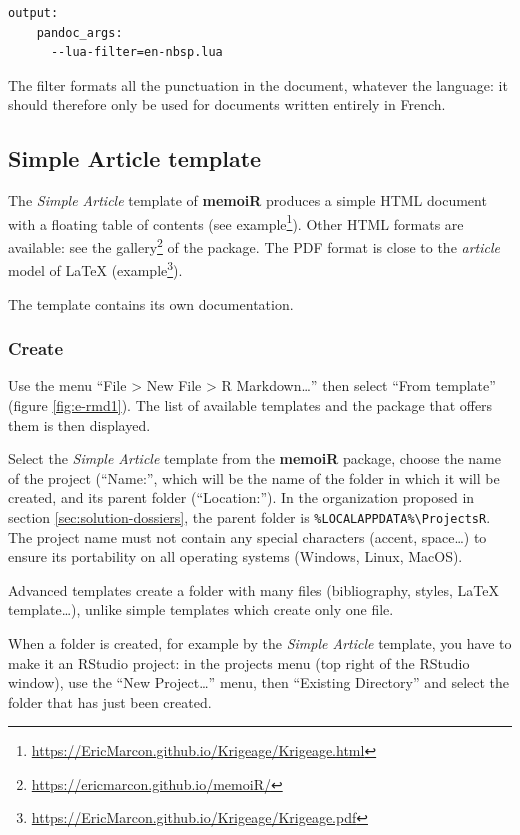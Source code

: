 \documentclass[
  12pt,
  american,
  a4paper,
  extrafontsizes,onecolumn,openright
  ]{memoir}
\begin{document}
\begin{verbatim}
output:
    pandoc_args:
      --lua-filter=en-nbsp.lua
\end{verbatim}

The filter formats all the punctuation in the document, whatever the language: it should therefore only be used for documents written entirely in French.

\subsection{Simple Article template}\label{sec:memo}

The \emph{Simple Article} template of \textbf{memoiR} produces a simple HTML document with a floating table of contents (see example\footnote{\url{https://EricMarcon.github.io/Krigeage/Krigeage.html}}).
Other HTML formats are available: see the gallery\footnote{\url{https://ericmarcon.github.io/memoiR/}} of the package.
The PDF format is close to the \emph{article} model of LaTeX (example\footnote{\url{https://EricMarcon.github.io/Krigeage/Krigeage.pdf}}).

The template contains its own documentation.

\subsubsection{Create}\label{create}

Use the menu \enquote{File \textgreater{} New File \textgreater{} R Markdown\ldots{}} then select \enquote{From template} (figure \ref{fig:e-rmd1}).
The list of available templates and the package that offers them is then displayed.

Select the \emph{Simple Article} template from the \textbf{memoiR} package, choose the name of the project (\enquote{Name:}, which will be the name of the folder in which it will be created, and its parent folder (\enquote{Location:}).
In the organization proposed in section \ref{sec:solution-dossiers}, the parent folder is \texttt{\%LOCALAPPDATA\%\textbackslash{}ProjectsR}.
The project name must not contain any special characters (accent, space\ldots) to ensure its portability on all operating systems (Windows, Linux, MacOS).

Advanced templates create a folder with many files (bibliography, styles, LaTeX template\ldots), unlike simple templates which create only one file.

When a folder is created, for example by the \emph{Simple Article} template, you have to make it an RStudio project: in the projects menu (top right of the RStudio window), use the \enquote{New Project\ldots{}} menu, then \enquote{Existing Directory} and select the folder that has just been created.
\end{document}

